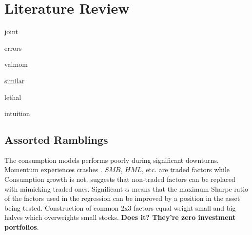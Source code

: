 
\section{Literature Review} \label{sec:Literature}

{joint}

{errors}

{valmom}

{similar}

{lethal}

{intuition}

\subsection{Assorted Ramblings}

The consumption models performs poorly during significant downturns.
Momentum experiences crashes \parencite{daniel2016momentum}.
$SMB$, $HML$, etc. are traded factors while Consumption growth is not.
\textcite{breeden2005intertemporal} suggests that non-traded factors can be replaced with 
mimicking traded ones.
Significant $\alpha$ means that the maximum Sharpe ratio of the factors used in the regression 
can be improved by a position in the asset being tested.
Construction of common 2x3 factors equal weight small and big halves which 
overweights small stocks. \textbf{Does it? They're zero investment portfolios}.

